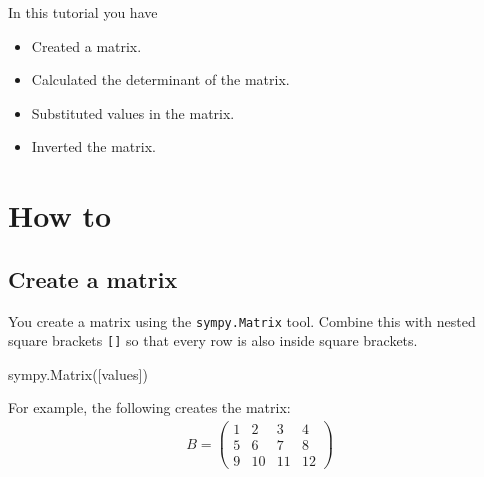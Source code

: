 \begin{note}
In this tutorial you have
\begin{itemize}
\item 

Created a matrix.

\item 

Calculated the determinant of the matrix.

\item 

Substituted values in the matrix.

\item 

Inverted the matrix.

\end{itemize}
\end{note}





\section{How to}
\label{\detokenize{tools-for-mathematics/04-matrices/how/main:how}}\label{\detokenize{tools-for-mathematics/04-matrices/how/main::doc}}

\subsection{Create a matrix}
\label{\detokenize{tools-for-mathematics/04-matrices/how/main:create-a-matrix}}

You create a matrix using the \texttt{sympy.Matrix} tool. Combine this with
nested square brackets \texttt{{[}{]}} so that every row is also inside square
brackets.


\begin{pyin}
sympy.Matrix([values])
\end{pyin}



For example, the following creates the matrix:
\begin{equation*}
\begin{split}
    B = \begin{pmatrix}
            1 & 2 & 3 & 4\\
            5 & 6 & 7 & 8\\
            9 & 10 & 11 & 12
        \end{pmatrix}
\end{split}
\end{equation*}



